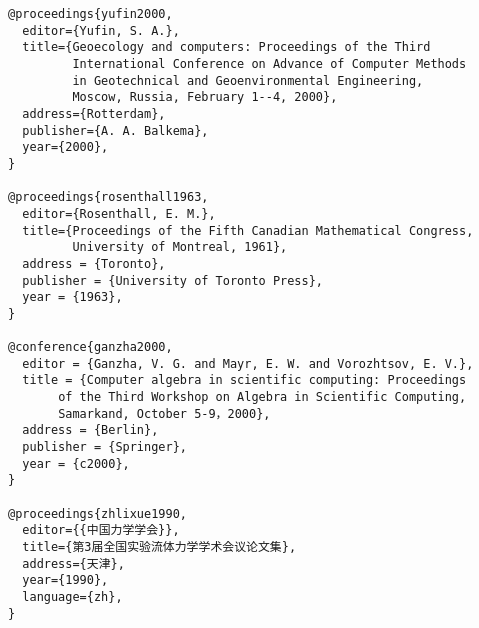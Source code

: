 \begin{verbatim}
@proceedings{yufin2000,
  editor={Yufin, S. A.},
  title={Geoecology and computers: Proceedings of the Third 
         International Conference on Advance of Computer Methods 
         in Geotechnical and Geoenvironmental Engineering, 
         Moscow, Russia, February 1--4, 2000},
  address={Rotterdam},
  publisher={A. A. Balkema},
  year={2000},
}

@proceedings{rosenthall1963,
  editor={Rosenthall, E. M.},
  title={Proceedings of the Fifth Canadian Mathematical Congress,
         University of Montreal, 1961},
  address = {Toronto},
  publisher = {University of Toronto Press},
  year = {1963},
}

@conference{ganzha2000,
  editor = {Ganzha, V. G. and Mayr, E. W. and Vorozhtsov, E. V.},
  title = {Computer algebra in scientific computing: Proceedings
       of the Third Workshop on Algebra in Scientific Computing, 
       Samarkand, October 5-9，2000},
  address = {Berlin},
  publisher = {Springer},
  year = {c2000},
}

@proceedings{zhlixue1990,
  editor={{中国力学学会}},
  title={第3届全国实验流体力学学术会议论文集},
  address={天津},
  year={1990},
  language={zh},
}
\end{verbatim}



